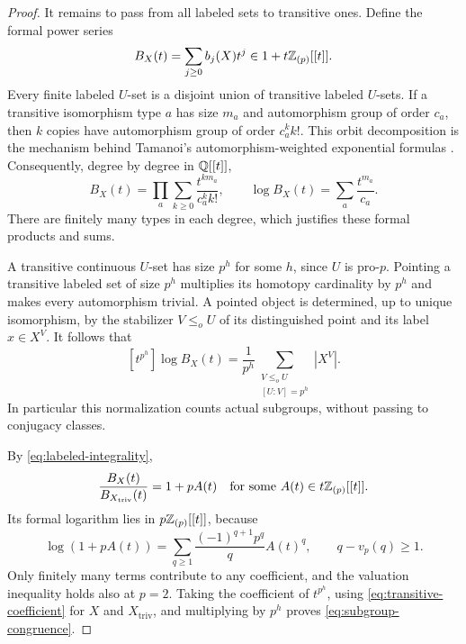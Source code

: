 \begin{proof}
It remains to pass from all labeled sets to transitive ones.  Define the
formal power series
\[
 B_X(t)=\sum_{j\geq0}b_j(X)t^j\in1+t\mathbb Z_{(p)}[[t]].
\]
Every finite labeled $U$-set is a disjoint union of transitive labeled
$U$-sets.  If a transitive isomorphism type $a$ has size $m_a$ and
automorphism group of order $c_a$, then $k$ copies have automorphism group
of order $c_a^k k!$.  This orbit decomposition is the mechanism behind
Tamanoi's automorphism-weighted exponential formulas
\cite[Theorem~5-5 and equation~(5-7)]{Tamanoi2003}.
Consequently, degree by degree in $\mathbb Q[[t]]$,
\begin{equation}\label{eq:transitive-exponential}
 B_X(t)=\prod_a\sum_{k\geq0}\frac{t^{k m_a}}{c_a^k k!},
 \qquad
 \log B_X(t)=\sum_a\frac{t^{m_a}}{c_a}.
\end{equation}
There are finitely many types in each degree, which justifies these formal
products and sums.

A transitive continuous $U$-set has size $p^h$ for some $h$, since $U$ is
pro-$p$.  Pointing a transitive labeled set of size $p^h$ multiplies its
homotopy cardinality by $p^h$ and makes every automorphism trivial.
A pointed object is determined, up to unique isomorphism, by the stabilizer
$V\le_oU$ of its distinguished point and its label $x\in X^V$.
It follows that
\begin{equation}\label{eq:transitive-coefficient}
 [t^{p^h}]\log B_X(t)
   =\frac1{p^h}\sum_{\substack{V\le_oU\\{}[U:V]=p^h}}|X^V|.
\end{equation}
In particular this normalization counts actual subgroups, without passing
to conjugacy classes.

By \eqref{eq:labeled-integrality},
\[
 \frac{B_X(t)}{B_{X_{\mathrm{triv}}}(t)}=1+pA(t)
       \quad\text{for some }A(t)\in t\mathbb Z_{(p)}[[t]].
\]
Its formal logarithm lies in $p\mathbb Z_{(p)}[[t]]$, because
\[
 \log(1+pA(t))
   =\sum_{q\geq1}\frac{(-1)^{q+1}p^q}{q}A(t)^q,
 \qquad q-v_p(q)\geq1.
\]
Only finitely many terms contribute to any coefficient, and the valuation
inequality holds also at $p=2$.  Taking the coefficient of $t^{p^h}$,
using \eqref{eq:transitive-coefficient} for $X$ and $X_{\mathrm{triv}}$,
and multiplying by $p^h$ proves \eqref{eq:subgroup-congruence}.
\end{proof}
